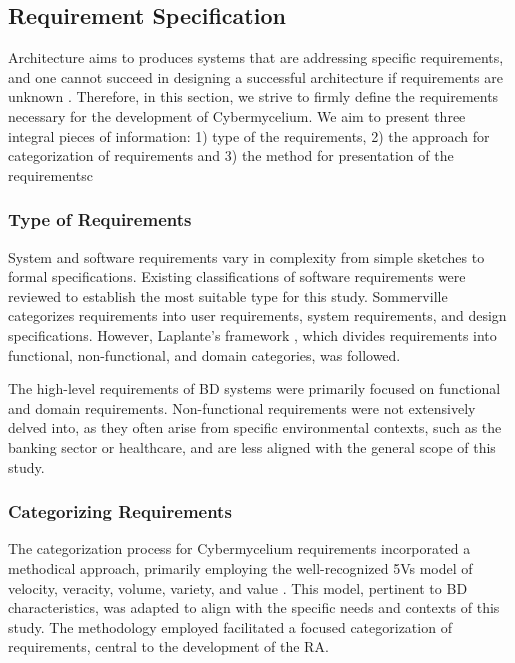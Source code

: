 \documentclass[review]{elsarticle}
\begin{document}
\subsection{Requirement Specification} \label{requirement-spec-methodology}

Architecture aims to produces systems that are addressing specific requirements, and one cannot succeed in designing a successful architecture if requirements are unknown \cite{SoftwareArchitectureKazman}. Therefore, in this section, we strive to firmly define the requirements necessary for the development of Cybermycelium. We aim to present three integral pieces of information: 1) type of the requirements, 2) the approach for categorization of requirements and 3) the method for presentation of the requirementsc


\subsubsection{Type of Requirements}

System and software requirements vary in complexity from simple sketches to formal specifications. Existing classifications of software requirements were reviewed to establish the most suitable type for this study. Sommerville \cite{sommerville2011software} categorizes requirements into user requirements, system requirements, and design specifications. However, Laplante's framework \cite{laplante2017requirements}, which divides requirements into functional, non-functional, and domain categories, was followed.

The high-level requirements of BD systems were primarily focused on functional and domain requirements. Non-functional requirements were not extensively delved into, as they often arise from specific environmental contexts, such as the banking sector or healthcare, and are less aligned with the general scope of this study.

\subsubsection{Categorizing Requirements}

The categorization process for Cybermycelium requirements incorporated a methodical approach, primarily employing the well-recognized 5Vs model of velocity, veracity, volume, variety, and value \cite{Bughin2016, rad2017big}. This model, pertinent to BD characteristics, was adapted to align with the specific needs and contexts of this study. The methodology employed facilitated a focused categorization of requirements, central to the development of the RA.
\end{document}
